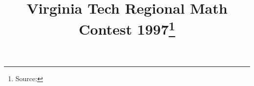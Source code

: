 \documentclass[10pt]{article}
\begin{document}
\title{Virginia Tech Regional Math Contest 1997\footnote{Source: \source}}
\author{\vspace{-2ex}}
\date{\vspace{-6ex}} %
\maketitle







\end{document}

